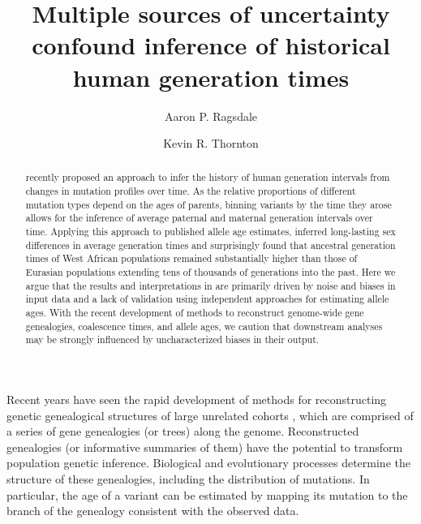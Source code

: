 \documentclass[]{article}
\title{Multiple sources of uncertainty confound inference of
historical human generation times}
\author[1,*]{Aaron P. Ragsdale}
\author[2]{Kevin R. Thornton}
\affil[1]{University of Wisconsin--Madison, Wisconsin, USA}
\affil[2]{University of California, Irvine, California, USA}
\affil[*]{apragsdale@wisc.edu}
\begin{document}
\maketitle

\begin{abstract}

    \noindent \citet{wang2023human} recently proposed an approach to infer the
    history of human generation intervals from changes in mutation profiles
    over time. As the relative proportions of different mutation types depend
    on the ages of parents, binning variants by the time they arose allows for
    the inference of average paternal and maternal generation intervals over
    time. Applying this approach to published allele age estimates,
    \citet{wang2023human} inferred long-lasting sex differences in average
    generation times and surprisingly found that ancestral generation times of
    West African populations remained substantially higher than those of
    Eurasian populations extending tens of thousands of generations into the
    past. Here we argue that the results and interpretations in
    \citet{wang2023human} are primarily driven by noise and biases in input
    data and a lack of validation using independent approaches for estimating
    allele ages. With the recent development of methods to reconstruct
    genome-wide gene genealogies, coalescence times, and allele ages, we
    caution that downstream analyses may be strongly influenced by
    uncharacterized biases in their output.

\end{abstract}

Recent years have seen the rapid development of methods for reconstructing
genetic genealogical structures of large unrelated cohorts
\citep{speidel2019method,wohns2022unified,hubisz2020mapping}, which are
comprised of a series of gene genealogies (or trees) along the genome.
Reconstructed genealogies (or informative summaries of them) have the potential
to transform population genetic inference. Biological and evolutionary
processes determine the structure of these genealogies, including the
distribution of mutations. In particular, the age of a variant can be estimated
by mapping its mutation to the branch of the genealogy consistent with the
observed data.
\end{document}
